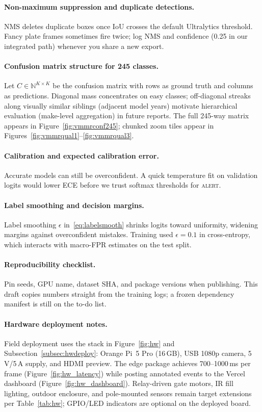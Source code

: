 \documentclass[10pt, conference]{IEEEtran}
\begin{document}
\paragraph{Non-maximum suppression and duplicate detections.}
NMS deletes duplicate boxes once IoU crosses the default Ultralytics threshold. Fancy plate frames sometimes fire twice; log NMS and confidence (0.25 in our integrated path) whenever you share a new export.

\paragraph{Confusion matrix structure for 245 classes.}
Let $C \in \mathbb{N}^{K\times K}$ be the confusion matrix with rows as ground truth and columns as predictions. Diagonal mass concentrates on easy classes; off-diagonal streaks along visually similar siblings (adjacent model years) motivate hierarchical evaluation (make-level aggregation) in future reports. The full 245-way matrix appears in Figure~\ref{fig:vmmrconf245}; chunked zoom tiles appear in Figures~\ref{fig:vmmrqual1}--\ref{fig:vmmrqual3}.

\paragraph{Calibration and expected calibration error.}
Accurate models can still be overconfident. A quick temperature fit on validation logits would lower ECE before we trust softmax thresholds for \textsc{alert}.

\paragraph{Label smoothing and decision margins.}
Label smoothing $\epsilon$ in~\eqref{eq:labelsmooth} shrinks logits toward uniformity, widening margins against overconfident mistakes. Training used $\epsilon{=}0.1$ in cross-entropy, which interacts with macro-FPR estimates on the test split.

\paragraph{Reproducibility checklist.}
Pin seeds, GPU name, dataset SHA, and package versions when publishing. This draft copies numbers straight from the training logs; a frozen dependency manifest is still on the to-do list.

\paragraph{Hardware deployment notes.}
Field deployment uses the stack in Figure~\ref{fig:hw} and Subsection~\ref{subsec:hwdeploy}: Orange Pi~5 Pro (16\,GB), USB 1080p camera, 5\,V/5\,A supply, and HDMI preview. The edge package achieves 700--1000\,ms per frame (Figure~\ref{fig:hw_latency}) while posting annotated events to the Vercel dashboard (Figure~\ref{fig:hw_dashboard}). Relay-driven gate motors, IR fill lighting, outdoor enclosure, and pole-mounted sensors remain target extensions per Table~\ref{tab:hw}; GPIO/LED indicators are optional on the deployed board.
\end{document}
